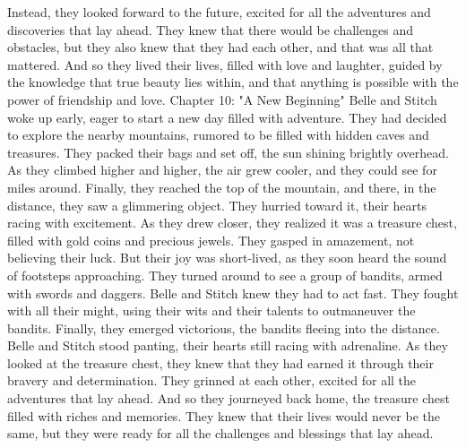 \documentclass{book}%
\begin{document}
\newline%
Instead, they looked forward to the future, excited for all the adventures and discoveries that lay ahead. They knew that there would be challenges and obstacles, but they also knew that they had each other, and that was all that mattered.\newline%
\newline%
And so they lived their lives, filled with love and laughter, guided by the knowledge that true beauty lies within, and that anything is possible with the power of friendship and love.%
Chapter 10: "A New Beginning"\newline%
\newline%
Belle and Stitch woke up early, eager to start a new day filled with adventure. They had decided to explore the nearby mountains, rumored to be filled with hidden caves and treasures.\newline%
\newline%
They packed their bags and set off, the sun shining brightly overhead. As they climbed higher and higher, the air grew cooler, and they could see for miles around.\newline%
\newline%
Finally, they reached the top of the mountain, and there, in the distance, they saw a glimmering object. They hurried toward it, their hearts racing with excitement.\newline%
\newline%
As they drew closer, they realized it was a treasure chest, filled with gold coins and precious jewels. They gasped in amazement, not believing their luck.\newline%
\newline%
But their joy was short{-}lived, as they soon heard the sound of footsteps approaching. They turned around to see a group of bandits, armed with swords and daggers.\newline%
\newline%
Belle and Stitch knew they had to act fast. They fought with all their might, using their wits and their talents to outmaneuver the bandits.\newline%
\newline%
Finally, they emerged victorious, the bandits fleeing into the distance. Belle and Stitch stood panting, their hearts still racing with adrenaline.\newline%
\newline%
As they looked at the treasure chest, they knew that they had earned it through their bravery and determination. They grinned at each other, excited for all the adventures that lay ahead.\newline%
\newline%
And so they journeyed back home, the treasure chest filled with riches and memories. They knew that their lives would never be the same, but they were ready for all the challenges and blessings that lay ahead.%
\end{document}
